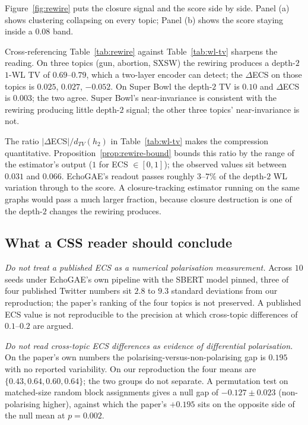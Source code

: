 \documentclass[letterpaper]{article} %
\begin{document}
Figure~\ref{fig:rewire} puts the closure signal and the score
side by side. Panel (a) shows clustering collapsing on every
topic; Panel (b) shows the score staying inside a $0.08$ band.

Cross-referencing Table~\ref{tab:rewire} against
Table~\ref{tab:wl-tv} sharpens the reading. On three topics
(gun, abortion, SXSW) the rewiring produces a depth-$2$ $1$-WL
TV of $0.69$--$0.79$, which a two-layer encoder can detect; the
$\Delta$ECS on those topics is $0.025$, $0.027$, $-0.052$. On
Super Bowl the depth-$2$ TV is $0.10$ and $\Delta$ECS is
$0.003$; the two agree. Super Bowl's near-invariance is
consistent with the rewiring producing little depth-$2$ signal;
the other three topics' near-invariance is not.

The ratio $|\Delta$ECS$| / d_{TV}(h_2)$ in
Table~\ref{tab:wl-tv} makes the compression quantitative.
Proposition~\ref{prop:rewire-bound} bounds this ratio by the
range of the estimator's output ($1$ for ECS $\in [0, 1]$); the
observed values sit between $0.031$ and $0.066$. EchoGAE's
readout passes roughly $3$--$7\%$ of the depth-$2$ WL variation
through to the score. A closure-tracking estimator running on the
same graphs would pass a much larger fraction, because closure
destruction is one of the depth-$2$ changes the rewiring
produces.

\subsection{What a CSS reader should conclude}\label{sec:reading}

\emph{Do not treat a published ECS as a numerical polarisation
measurement.} Across $10$ seeds under EchoGAE's own pipeline with
the SBERT model pinned, three of four published Twitter numbers
sit $2.8$ to $9.3$ standard deviations from our reproduction; the
paper's ranking of the four topics is not preserved. A published
ECS value is not reproducible to the precision at which
cross-topic differences of $0.1$--$0.2$ are argued.

\emph{Do not read cross-topic ECS differences as evidence of
differential polarisation.} On the paper's own numbers the
polarising-versus-non-polarising gap is $0.195$ with no reported
variability. On our reproduction the four means are $\{0.43,
0.64, 0.60, 0.64\}$; the two groups do not separate. A
permutation test on matched-size random block assignments
gives a null gap of $-0.127 \pm 0.023$ (non-polarising
higher), against which the paper's $+0.195$ sits on the
opposite side of the null mean at $p = 0.002$.
\end{document}
